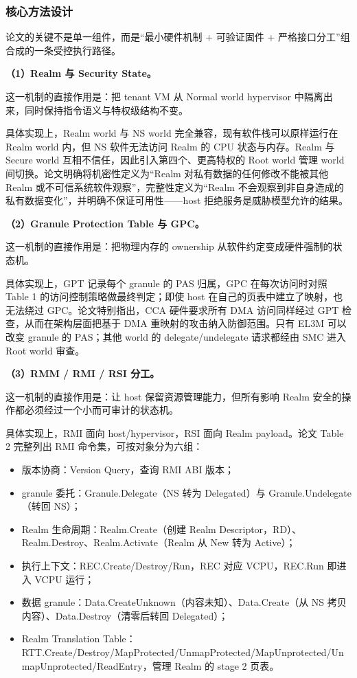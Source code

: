 \documentclass[11pt]{ctexart}
\begin{document}
\subsubsection{核心方法设计}
论文的关键不是单一组件，而是“最小硬件机制 + 可验证固件 + 严格接口分工”组合成的一条受控执行路径。\par
\noindent\textbf{（1）Realm 与 Security State。}\par
这一机制的直接作用是：把 tenant VM 从 Normal world hypervisor 中隔离出来，同时保持指令语义与特权级结构不变。\par
具体实现上，Realm world 与 NS world 完全兼容，现有软件栈可以原样运行在 Realm world 内，但 NS 软件无法访问 Realm 的 CPU 状态与内存。Realm 与 Secure world 互相不信任，因此引入第四个、更高特权的 Root world 管理 world 间切换。论文明确将机密性定义为“Realm 对私有数据的任何修改不能被其他 Realm 或不可信系统软件观察”，完整性定义为“Realm 不会观察到非自身造成的私有数据变化”，并明确不保证可用性——host 拒绝服务是威胁模型允许的结果。\par
\noindent\textbf{（2）Granule Protection Table 与 GPC。}\par
这一机制的直接作用是：把物理内存的 ownership 从软件约定变成硬件强制的状态机。\par
具体实现上，GPT 记录每个 granule 的 PAS 归属，GPC 在每次访问时对照 Table 1 的访问控制策略做最终判定；即使 host 在自己的页表中建立了映射，也无法绕过 GPC。论文特别指出，CCA 硬件要求所有 DMA 访问同样经过 GPT 检查，从而在架构层面把基于 DMA 重映射的攻击纳入防御范围。只有 EL3M 可以改变 granule 的 PAS；其他 world 的 delegate/undelegate 请求都经由 SMC 进入 Root world 审查。\par
\noindent\textbf{（3）RMM / RMI / RSI 分工。}\par
这一机制的直接作用是：让 host 保留资源管理能力，但所有影响 Realm 安全的操作都必须经过一个小而可审计的状态机。\par
具体实现上，RMI 面向 host/hypervisor，RSI 面向 Realm payload。论文 Table 2 完整列出 RMI 命令集，可按对象分为六组：
\begin{itemize}
\item 版本协商：Version Query，查询 RMI ABI 版本；
\item granule 委托：Granule.Delegate（NS 转为 Delegated）与 Granule.Undelegate（转回 NS）；
\item Realm 生命周期：Realm.Create（创建 Realm Descriptor，RD）、Realm.Destroy、Realm.Activate（Realm 从 New 转为 Active）；
\item 执行上下文：REC.Create/Destroy/Run，REC 对应 VCPU，REC.Run 即进入 VCPU 运行；
\item 数据 granule：Data.CreateUnknown（内容未知）、Data.Create（从 NS 拷贝内容）、Data.Destroy（清零后转回 Delegated）；
\item Realm Translation Table：RTT.Create/Destroy/MapProtected/UnmapProtected/MapUnprotected/UnmapUnprotected/ReadEntry，管理 Realm 的 stage 2 页表。
\end{itemize}
\end{document}
